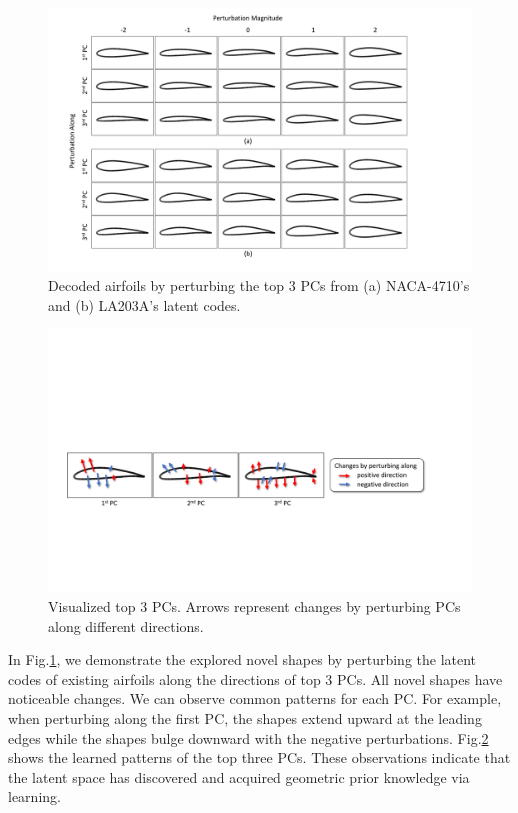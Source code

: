\begin{figure}[!htb]
	\begin{center}
		\includegraphics[width=1\linewidth]{chapter3/tex/figures/experiment/latent_factorization.pdf}
	\end{center}
	\caption{
		\small Decoded airfoils by perturbing the top 3 PCs from (a) NACA-4710's and (b) LA203A's latent codes.
	}
	\label{ch3:fig:discuss_latent_factor}
\end{figure}
\begin{figure}[!htb]
	\begin{center}
		\includegraphics[width=1\linewidth]{chapter3/tex/figures/experiment/latent_factorization_pattern.pdf}
	\end{center}
	\caption{
		\small Visualized top 3 PCs. Arrows represent changes by perturbing PCs along different directions.
	}
	\label{ch3:fig:discuss_latent_factor_pattern}
\end{figure}

In Fig.\ref{ch3:fig:discuss_latent_factor}, we demonstrate the explored novel shapes by perturbing the latent codes of existing airfoils along the directions of top 3 PCs.
All novel shapes have noticeable changes.
We can observe common patterns for each PC.
For example, when perturbing along the first PC, the shapes extend upward at the leading edges while the shapes bulge downward with the negative perturbations.
Fig.\ref{ch3:fig:discuss_latent_factor_pattern} shows the learned patterns of the top three PCs.
These observations indicate that the latent space has discovered and acquired geometric prior knowledge via learning.

